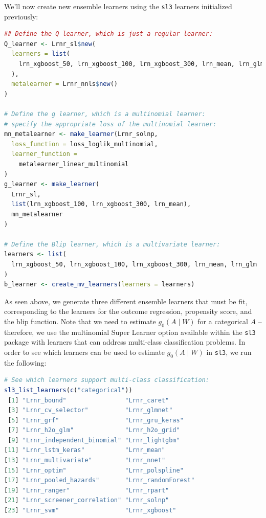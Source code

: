 \documentclass[12pt, krantz2,]{krantz}
\newcommand{\passthrough}[1]{#1}
\theoremstyle{definition}
\theoremstyle{definition}
\theoremstyle{definition}
\newcommand{\1}{\mathbbm{1}}
\begin{document}
We'll now create new ensemble learners using the
\passthrough{\lstinline!sl3!} learners initialized previously:

\begin{lstlisting}[language=R]
## Define the Q learner, which is just a regular learner:
Q_learner <- Lrnr_sl$new(
  learners = list(
    lrn_xgboost_50, lrn_xgboost_100, lrn_xgboost_300, lrn_mean, lrn_glm
  ),
  metalearner = Lrnr_nnls$new()
)

# Define the g learner, which is a multinomial learner:
# specify the appropriate loss of the multinomial learner:
mn_metalearner <- make_learner(Lrnr_solnp,
  loss_function = loss_loglik_multinomial,
  learner_function =
    metalearner_linear_multinomial
)
g_learner <- make_learner(
  Lrnr_sl,
  list(lrn_xgboost_100, lrn_xgboost_300, lrn_mean),
  mn_metalearner
)

# Define the Blip learner, which is a multivariate learner:
learners <- list(
  lrn_xgboost_50, lrn_xgboost_100, lrn_xgboost_300, lrn_mean, lrn_glm
)
b_learner <- create_mv_learners(learners = learners)
\end{lstlisting}

As seen above, we generate three different ensemble learners that must be fit,
corresponding to the learners for the outcome regression, propensity score, and
the blip function. Note that we need to estimate \(g_0(A \mid W)\) for a
categorical \(A\) -- therefore, we use the multinomial Super Learner option
available within the \passthrough{\lstinline!sl3!} package with learners that can address multi-class
classification problems. In order to see which learners can be used to estimate
\(g_0(A \mid W)\) in \passthrough{\lstinline!sl3!}, we run the following:

\begin{lstlisting}[language=R]
# See which learners support multi-class classification:
sl3_list_learners(c("categorical"))
 [1] "Lrnr_bound"                "Lrnr_caret"               
 [3] "Lrnr_cv_selector"          "Lrnr_glmnet"              
 [5] "Lrnr_grf"                  "Lrnr_gru_keras"           
 [7] "Lrnr_h2o_glm"              "Lrnr_h2o_grid"            
 [9] "Lrnr_independent_binomial" "Lrnr_lightgbm"            
[11] "Lrnr_lstm_keras"           "Lrnr_mean"                
[13] "Lrnr_multivariate"         "Lrnr_nnet"                
[15] "Lrnr_optim"                "Lrnr_polspline"           
[17] "Lrnr_pooled_hazards"       "Lrnr_randomForest"        
[19] "Lrnr_ranger"               "Lrnr_rpart"               
[21] "Lrnr_screener_correlation" "Lrnr_solnp"               
[23] "Lrnr_svm"                  "Lrnr_xgboost"             
\end{lstlisting}
\end{document}
